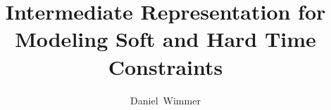 \documentclass[a4paper,oneside,10pt,ngerman,english]{scrbook}
\begin{document}
\frontmatter


\title{Intermediate Representation for Modeling Soft and Hard Time Constraints}



\author{Daniel~Wimmer }



\end{document}
